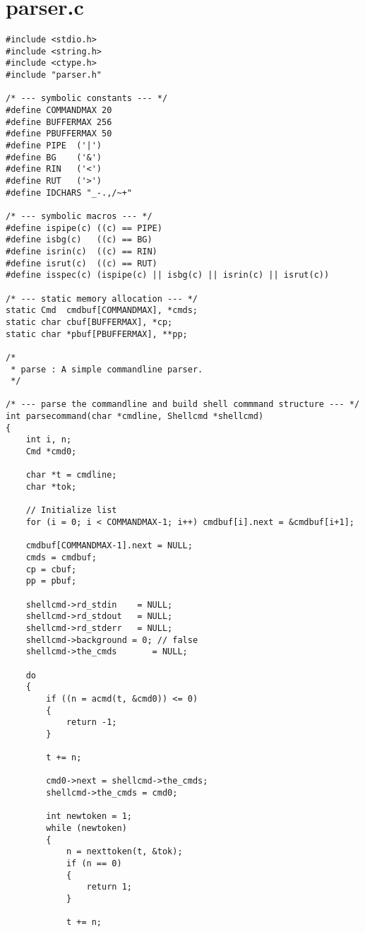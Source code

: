 \chapter{parser.c}
\begin{lstlisting}
#include <stdio.h>
#include <string.h>
#include <ctype.h>
#include "parser.h"

/* --- symbolic constants --- */
#define COMMANDMAX 20
#define BUFFERMAX 256
#define PBUFFERMAX 50
#define PIPE  ('|')
#define BG    ('&')
#define RIN   ('<')
#define RUT   ('>')
#define IDCHARS "_-.,/~+"

/* --- symbolic macros --- */
#define ispipe(c) ((c) == PIPE)
#define isbg(c)   ((c) == BG)
#define isrin(c)  ((c) == RIN)
#define isrut(c)  ((c) == RUT)
#define isspec(c) (ispipe(c) || isbg(c) || isrin(c) || isrut(c))

/* --- static memory allocation --- */
static Cmd  cmdbuf[COMMANDMAX], *cmds;
static char cbuf[BUFFERMAX], *cp;
static char *pbuf[PBUFFERMAX], **pp;

/*
 * parse : A simple commandline parser.
 */

/* --- parse the commandline and build shell commmand structure --- */
int parsecommand(char *cmdline, Shellcmd *shellcmd)
{
	int i, n;
	Cmd *cmd0;

	char *t = cmdline;
	char *tok;

	// Initialize list
	for (i = 0; i < COMMANDMAX-1; i++) cmdbuf[i].next = &cmdbuf[i+1];
    
	cmdbuf[COMMANDMAX-1].next = NULL;
	cmds = cmdbuf;
	cp = cbuf;
	pp = pbuf;

	shellcmd->rd_stdin    = NULL;
	shellcmd->rd_stdout   = NULL;
	shellcmd->rd_stderr   = NULL;
	shellcmd->background = 0; // false 
	shellcmd->the_cmds       = NULL;

	do 
	{
		if ((n = acmd(t, &cmd0)) <= 0)
		{
			return -1;
		}
		
		t += n;

		cmd0->next = shellcmd->the_cmds;
		shellcmd->the_cmds = cmd0;

		int newtoken = 1;
		while (newtoken) 
		{
			n = nexttoken(t, &tok);
			if (n == 0)
			{
				return 1;
			}
			
			t += n;


\end{lstlisting}
